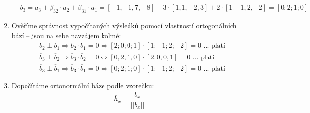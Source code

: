 \documentclass[12pt,a4paper]{article}
\begin{document}
\begin{enumerate}
\begin{align*}
        &\overline{b}_3 = \overline{a}_3 + \beta_{32} \cdot \overline{a}_2 + \beta_{31} \cdot \overline{a}_1  = [- 1, - 1, 7, - 8] - 3 \cdot [1, 1, - 2, 3] + 2 \cdot [1, - 1, 2, - 2] = [0;2;1;0]
    \end{align*}
    \item Ověříme správnost vypočítaných výsledků pomocí vlastností ortogonálních bází – jsou na sebe navzájem kolmé:
    \begin{align*}
        &\overline{b}_2 \perp \overline{b}_1 \Rightarrow \overline{b}_2 \cdot \overline{b}_1 = 0 \Leftrightarrow [2;0;0;1] \cdot [1;-1;2;-2] = 0 \text{ ... platí} \\
        &\overline{b}_3 \perp \overline{b}_2 \Rightarrow \overline{b}_3 \cdot \overline{b}_2 = 0 \Leftrightarrow [0;2;1;0] \cdot [2;0;0;1] = 0 \text{ ... platí} \\
        &\overline{b}_3 \perp \overline{b}_1 \Rightarrow \overline{b}_3 \cdot \overline{b}_1 = 0 \Leftrightarrow [0;2;1;0] \cdot [1;-1;2;-2] = 0 \text{ ... platí}
    \end{align*}
    \newpage
    \item Dopočítáme ortonormální báze podle vzorečku:
    $$ \overline{h}_x = \frac{\overline{b}_x}{||\overline{b}_x||} $$
    

\end{enumerate}
\end{document}

